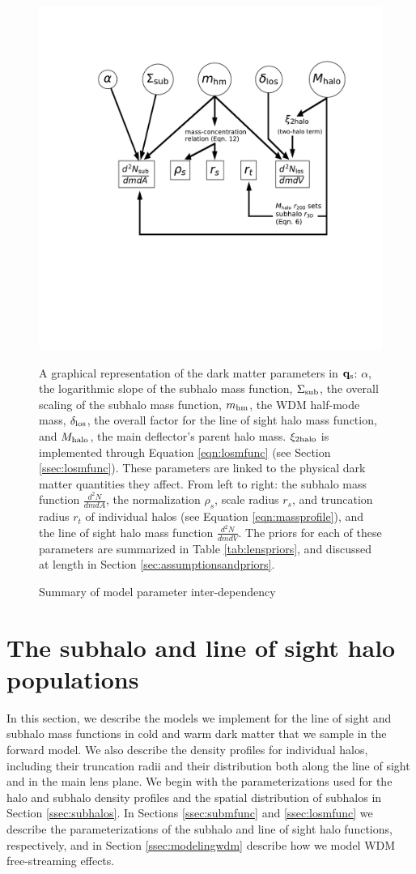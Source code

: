 \begin{figure}
	\centering
	\includegraphics[clip,trim=3.8cm 8cm 2.5cm
	4cm,width=.8\textwidth,keepaspectratio]{./figures_wdmchillsout/schematic.pdf}
	\caption{Summary of model parameter inter-dependency}{\label{fig:schematic} A graphical representation of the dark matter parameters in ${\bf{q}_{\rm{s}}}$: $\alpha$, the logarithmic slope of the subhalo mass function, $\Sigma_{\rm{sub}}$, the overall scaling of the subhalo mass function, ${m_{\rm{hm}}}$, the WDM half-mode mass, $\delta_{\rm{los}}$, the overall factor for the  line of sight halo mass function, and $M_{\rm{halo}}$, the main deflector's parent halo mass. $\xi_{\rm{2halo}}$ is implemented through Equation \ref{eqn:losmfunc} (see Section \ref{ssec:losmfunc}). These parameters are linked to the physical dark matter quantities they affect. From left to right: the subhalo mass function $\frac{d^2 N}{dm dA}$, the normalization $\rho_s$, scale radius $r_s$, and truncation radius $r_t$ of individual halos (see Equation \ref{eqn:massprofile}), and the line of sight halo mass function $\frac{d^2 N}{dm dV}$. The priors for each of these parameters are summarized in Table \ref{tab:lenspriors}, and discussed at length in Section \ref{sec:assumptionsandpriors}.}
\end{figure}	

\section{The subhalo and line of sight halo populations}
\label{sec:parameterizations}
In this section, we describe the models we implement for the line of sight and subhalo mass functions in cold and warm dark matter that we sample in the forward model. We also describe the density profiles for individual halos, including their truncation radii and their distribution both along the line of sight and in the main lens plane. We begin with the parameterizations used for the halo and subhalo density profiles and the spatial distribution of subhalos in Section \ref{ssec:subhalos}. In Sections \ref{ssec:submfunc} and \ref{ssec:losmfunc} we describe the parameterizations of the subhalo and line of sight halo functions, respectively, and in Section \ref{ssec:modelingwdm} describe how we model WDM free-streaming effects. 


